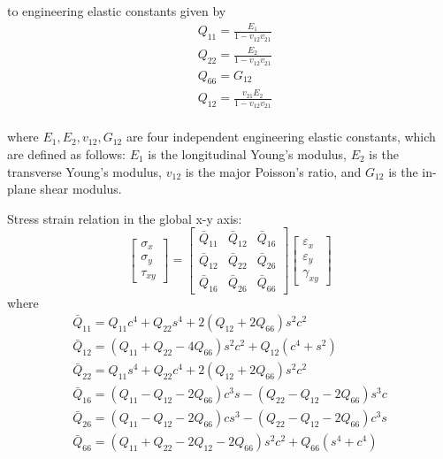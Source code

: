 \documentclass[USenglish]{article}
\begin{document}
to engineering elastic constants given by
\begin{equation}
    \begin{split}
    &Q_{11}=\frac{E_1}{1-v_{12}v_{21}}\\
    &Q_{22}=\frac{E_2}{1-v_{12}v_{21}}\\
    &Q_{66}=G_{12}\\
    &Q_{12}=\frac{v_{21}E_2}{1-v_{12}v_{21}}\\
    \end{split}
\end{equation}

where $E_1, E_2, v_{12}, G_{12} $ are four independent engineering elastic constants, which are defined as follows: $E_1 $ is the longitudinal Young's modulus, $E_2 $ is the transverse Young's modulus, $v_{12} $ is the major Poisson's ratio, and $G_{12} $ is the in-plane shear modulus.

Stress strain relation in the global x-y axis:
\begin{equation}\left[\begin{array}{l}\sigma _{x} \\ \sigma _{y} \\ \tau_{xy}\end{array}\right]=\left[\begin{array}{lll}\bar{Q}_{11} & \bar{Q}_{12} & \bar{Q}_{16}\\ \bar{Q}_{12} & \bar{Q}_{22} & \bar{Q}_{26} \\ \bar{Q}_{16} & \bar{Q}_{26} &\bar{Q}_{66}\end{array}\right]\left[\begin{array}{l}\varepsilon_{x} \\ \varepsilon_{y}\\ \gamma_{x y}\end{array}\right]
\end{equation}
where
\begin{equation}\begin{array}{l}\bar{Q}_{11}=Q_{11} c^{4}+Q_{22} s^{4}+2\left(Q_{12}+2 Q_{66}\right) s^{2} c^{2}\\ \bar{Q}_{12}=\left(Q_{11}+Q_{22}-4 Q_{66}\right) s^{2} c^{2}+Q_{12}\left(c^{4}+s^{2}\right)\\ \bar{Q}_{22}=Q_{11} s^{4}+Q_{22} c^{4}+2\left(Q_{12}+2 Q_{66}\right) s^{2} c^{2} \\\bar{Q}_{16}=\left(Q_{11}-Q_{12}-2 Q_{66}\right) c^{3} s-\left(Q_{22}-Q_{12}-2Q_{66}\right) s^{3} c \\ \bar{Q}_{26}=\left(Q_{11}-Q_{12}-2 Q_{66}\right) c s^{3}-\left(Q_{22}-Q_{12}-2 Q_{66}\right)c^{3} s \\ \bar{Q}_{66}=\left(Q_{11}+Q_{22}-2 Q_{12}-2 Q_{66}\right) s^{2}c^{2}+Q_{66}\left(s^{4}+c^{4}\right)\\\end{array}
\end{equation}
\end{document}
